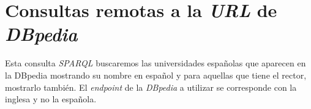 \documentclass[10pt,a4paper]{report}
\begin{document}
	
	
	\chapter{Consultas remotas a la \textit{URL} de \textit{DBpedia}}
	Esta consulta \textit{SPARQL} buscaremos las universidades espa\~nolas que aparecen en la DBpedia mostrando su nombre en espa\~nol y para aquellas que tiene el rector, mostrarlo tambi\'en. El \textit{endpoint} de la \textit{DBpedia} a utilizar se corresponde con la inglesa y no la espa\~nola.
	
	
	
	
	
	
	
	
	
\end{document}
